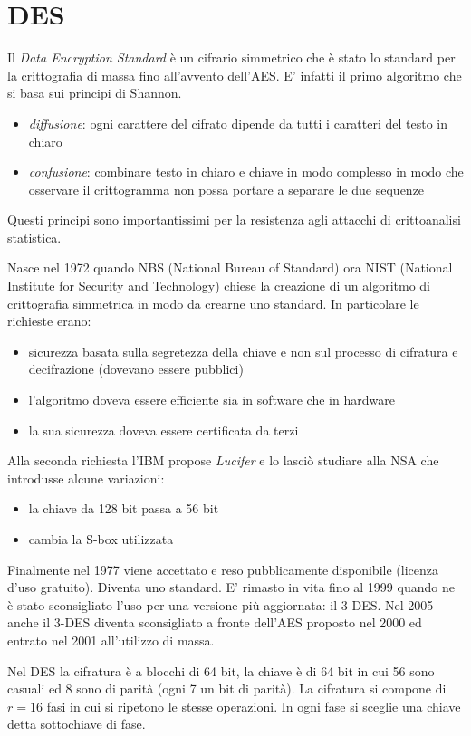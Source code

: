 \section{DES}
Il \emph{Data Encryption Standard} è un cifrario simmetrico che è stato lo standard per la crittografia di massa fino all'avvento dell'AES.
E' infatti il primo algoritmo che si basa sui principi di Shannon.
\begin{itemize}
    \item \emph{diffusione}: ogni carattere del cifrato dipende da tutti i caratteri del testo in chiaro
    \item \emph{confusione}: combinare testo in chiaro e chiave in modo complesso in modo che osservare il crittogramma non possa portare a separare le due sequenze
\end{itemize}
Questi principi sono importantissimi per la resistenza agli attacchi di crittoanalisi statistica.

Nasce nel 1972 quando NBS (National Bureau of Standard) ora NIST (National Institute for Security and Technology) chiese la creazione di un algoritmo di crittografia simmetrica in modo da crearne uno standard. In particolare le richieste erano:
\begin{itemize}
    \item sicurezza basata sulla segretezza della chiave e non sul processo di cifratura e decifrazione (dovevano essere pubblici)
    \item l'algoritmo doveva essere efficiente sia in software che in hardware
    \item la sua sicurezza doveva essere certificata da terzi
\end{itemize}
Alla seconda richiesta l'IBM propose \emph{Lucifer} e lo lasciò studiare alla NSA che introdusse alcune variazioni:
\begin{itemize}
    \item la chiave da 128 bit passa a 56 bit
    \item cambia la S-box utilizzata
\end{itemize}

Finalmente nel 1977 viene accettato e reso pubblicamente disponibile (licenza d'uso gratuito). Diventa uno standard.
E' rimasto in vita fino al 1999 quando ne è stato sconsigliato l'uso per una versione più aggiornata: il 3-DES.
Nel 2005 anche il 3-DES diventa sconsigliato a fronte dell'AES proposto nel 2000 ed entrato nel 2001 all'utilizzo di massa.

Nel DES la cifratura è a blocchi di 64 bit, la chiave è di 64 bit in cui 56 sono casuali ed 8 sono di parità (ogni 7 un bit di parità).
La cifratura si compone di $r=16$ fasi in cui si ripetono le stesse operazioni. In ogni fase si sceglie una chiave detta sottochiave di fase.

